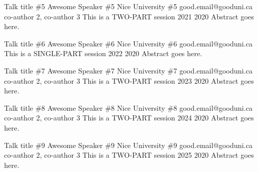 \documentclass[12pt,a4paper,figuresright]{book}
\begin{document}
\begin{talk}
	{Talk title \#5}%
	{Awesome Speaker \#5}%
	{Nice University \#5}%
	{good.email@gooduni.ca}%
	{co-author 2, co-author 3}%
	{This is a TWO-PART session}%
	{}%
	{2021}%
	{2020}%
	Abstract goes here.
\end{talk}

\begin{talk}
	{Talk title \#6}%
	{Awesome Speaker \#6}%
	{Nice University \#6}%
	{good.email@gooduni.ca}%
	{}%
	{This is a SINGLE-PART session}%
	{}%
	{2022}%
	{2020}%
	Abstract goes here.
\end{talk}

\begin{talk}
	{Talk title \#7}%
	{Awesome Speaker \#7}%
	{Nice University \#7}%
	{good.email@gooduni.ca}%
	{co-author 2, co-author 3}%
	{This is a TWO-PART session}%
	{}%
	{2023}%
	{2020}%
	Abstract goes here.
\end{talk}

\begin{talk}
	{Talk title \#8}%
	{Awesome Speaker \#8}%
	{Nice University \#8}%
	{good.email@gooduni.ca}%
	{co-author 2, co-author 3}%
	{This is a TWO-PART session}%
	{}%
	{2024}%
	{2020}%
	Abstract goes here.
\end{talk}

\begin{talk}
	{Talk title \#9}%
	{Awesome Speaker \#9}%
	{Nice University \#9}%
	{good.email@gooduni.ca}%
	{co-author 2, co-author 3}%
	{This is a TWO-PART session}%
	{}%
	{2025}%
	{2020}%
	Abstract goes here.
\end{talk}
\end{document}
